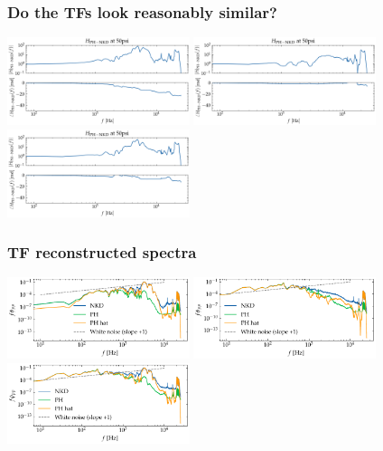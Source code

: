 \documentclass[aspectratio=169,9pt]{beamer}
\begin{document}
\begin{frame}
    \frametitle{Do the TFs look reasonably similar?}
        \centering
        \includegraphics[width=0.4\textwidth]{sanity/50psi/PH-NKD/H_50psi_nn.png}
        \includegraphics[width=0.4\textwidth]{sanity/50psi/PH-NKD/H_50psi_fn.png}
        \includegraphics[width=0.4\textwidth]{sanity/50psi/PH-NKD/H_50psi_an.png}
\end{frame}

\begin{frame}
    \frametitle{TF reconstructed spectra}
        \centering
        \includegraphics[width=0.4\textwidth]{sanity/50psi/PH-NKD/calib_spectra_50psi_nn_recon.pdf}
        \includegraphics[width=0.4\textwidth]{sanity/50psi/PH-NKD/calib_spectra_50psi_fn_recon.pdf}
        \includegraphics[width=0.4\textwidth]{sanity/50psi/PH-NKD/calib_spectra_50psi_an_recon.pdf}
\end{frame}
\end{document}
